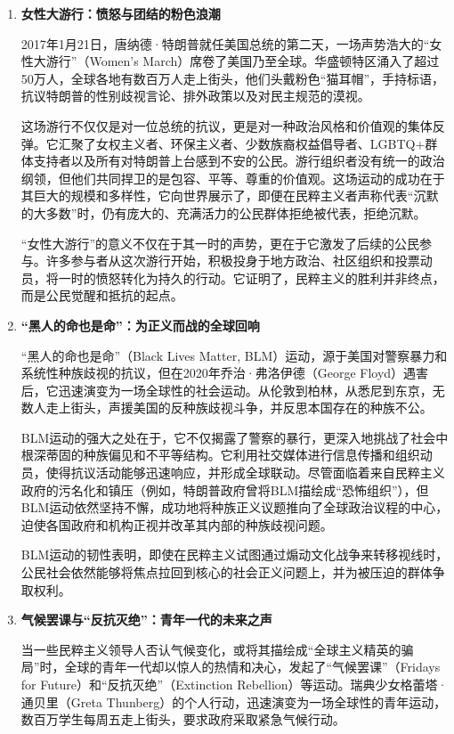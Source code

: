 \begin{enumerate}
    \item \textbf{女性大游行：愤怒与团结的粉色浪潮}

    2017年1月21日，唐纳德·特朗普就任美国总统的第二天，一场声势浩大的“女性大游行”（Women's March）席卷了美国乃至全球。华盛顿特区涌入了超过50万人，全球各地有数百万人走上街头，他们头戴粉色“猫耳帽”，手持标语，抗议特朗普的性别歧视言论、排外政策以及对民主规范的漠视。

    这场游行不仅仅是对一位总统的抗议，更是对一种政治风格和价值观的集体反弹。它汇聚了女权主义者、环保主义者、少数族裔权益倡导者、LGBTQ+群体支持者以及所有对特朗普上台感到不安的公民。游行组织者没有统一的政治纲领，但他们共同捍卫的是包容、平等、尊重的价值观。这场运动的成功在于其巨大的规模和多样性，它向世界展示了，即便在民粹主义者声称代表“沉默的大多数”时，仍有庞大的、充满活力的公民群体拒绝被代表，拒绝沉默。

    “女性大游行”的意义不仅在于其一时的声势，更在于它激发了后续的公民参与。许多参与者从这次游行开始，积极投身于地方政治、社区组织和投票动员，将一时的愤怒转化为持久的行动。它证明了，民粹主义的胜利并非终点，而是公民觉醒和抵抗的起点。

    \item \textbf{“黑人的命也是命”：为正义而战的全球回响}

    “黑人的命也是命”（Black Lives Matter, BLM）运动，源于美国对警察暴力和系统性种族歧视的抗议，但在2020年乔治·弗洛伊德（George Floyd）遇害后，它迅速演变为一场全球性的社会运动。从伦敦到柏林，从悉尼到东京，无数人走上街头，声援美国的反种族歧视斗争，并反思本国存在的种族不公。

    BLM运动的强大之处在于，它不仅揭露了警察的暴行，更深入地挑战了社会中根深蒂固的种族偏见和不平等结构。它利用社交媒体进行信息传播和组织动员，使得抗议活动能够迅速响应，并形成全球联动。尽管面临着来自民粹主义政府的污名化和镇压（例如，特朗普政府曾将BLM描绘成“恐怖组织”），但BLM运动依然坚持不懈，成功地将种族正义议题推向了全球政治议程的中心，迫使各国政府和机构正视并改革其内部的种族歧视问题。

    BLM运动的韧性表明，即使在民粹主义试图通过煽动文化战争来转移视线时，公民社会依然能够将焦点拉回到核心的社会正义问题上，并为被压迫的群体争取权利。

    \item \textbf{气候罢课与“反抗灭绝”：青年一代的未来之声}

    当一些民粹主义领导人否认气候变化，或将其描绘成“全球主义精英的骗局”时，全球的青年一代却以惊人的热情和决心，发起了“气候罢课”（Fridays for Future）和“反抗灭绝”（Extinction Rebellion）等运动。瑞典少女格蕾塔·通贝里（Greta Thunberg）的个人行动，迅速演变为一场全球性的青年运动，数百万学生每周五走上街头，要求政府采取紧急气候行动。


\end{enumerate}

